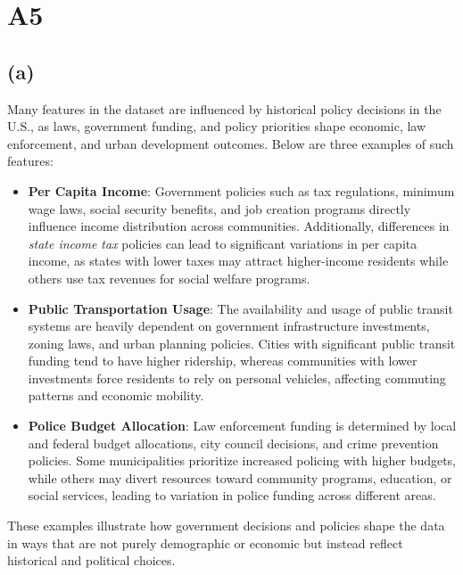 \documentclass{article}
\begin{document}
\section*{A5}

\subsection*{(a)}

Many features in the dataset are influenced by historical policy decisions in the U.S., as laws, government funding, and policy priorities shape economic, law enforcement, and urban development outcomes. Below are three examples of such features:

\begin{itemize}
    \item \textbf{Per Capita Income}: 
    Government policies such as tax regulations, minimum wage laws, social security benefits, and job creation programs directly influence income distribution across communities. Additionally, differences in \textit{state income tax} policies can lead to significant variations in per capita income, as states with lower taxes may attract higher-income residents while others use tax revenues for social welfare programs.
    
    \item \textbf{Public Transportation Usage}: 
    The availability and usage of public transit systems are heavily dependent on government infrastructure investments, zoning laws, and urban planning policies. Cities with significant public transit funding tend to have higher ridership, whereas communities with lower investments force residents to rely on personal vehicles, affecting commuting patterns and economic mobility.
    
    \item \textbf{Police Budget Allocation}: 
    Law enforcement funding is determined by local and federal budget allocations, city council decisions, and crime prevention policies. Some municipalities prioritize increased policing with higher budgets, while others may divert resources toward community programs, education, or social services, leading to variation in police funding across different areas.
\end{itemize}

These examples illustrate how government decisions and policies shape the data in ways that are not purely demographic or economic but instead reflect historical and political choices.
\end{document}
